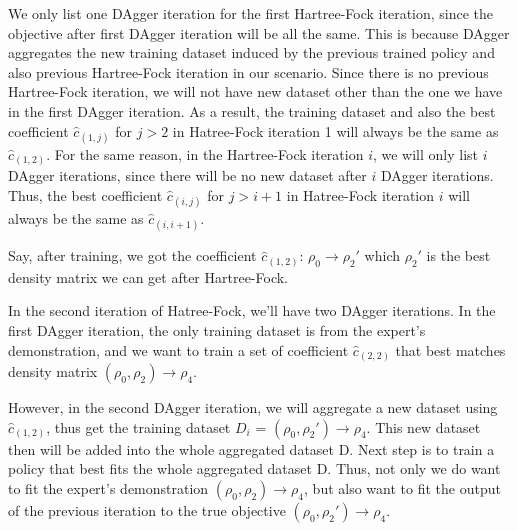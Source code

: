 \documentclass[twoside,11pt]{article}
\begin{document}
We only list one DAgger iteration for the first Hartree-Fock iteration, since the objective after first DAgger iteration will be all the same. This is because DAgger aggregates the new training dataset induced by the previous trained policy and also previous Hartree-Fock iteration in our scenario. Since there is no previous Hartree-Fock iteration, we will not have new dataset other than the one we have in the first DAgger iteration. As a result, the training dataset and also the best coefficient $\hat{c}_{(1,j)}$ for $j>2$ in Hatree-Fock iteration 1 will always be the same as $\hat{c}_{(1,2)}$. For the same reason, in the Hartree-Fock iteration $i$, we will only list $i$ DAgger iterations, since there will be no new dataset after $i$ DAgger iterations. Thus, the best coefficient $\hat{c}_{(i,j)}$ for $j>i+1$ in Hatree-Fock iteration $i$ will always be the same as $\hat{c}_{(i,i+1)}$.

Say, after training, we got the coefficient $\hat{c}_{(1,2)}$: $\rho_0 \rightarrow \rho_{2}'$ which $\rho_2'$ is the best density matrix we can get after Hartree-Fock.


In the second iteration of Hatree-Fock, we'll have two DAgger iterations. In the first DAgger iteration, the only training dataset is from the expert's demonstration, and we want to train a set of coefficient  $\hat{c}_{(2,2)}$ that best matches density matrix $(\rho_0,\rho_2) \rightarrow \rho_4$.

However, in the second DAgger iteration, we will aggregate a new dataset using $\hat{c}_{(1,2)}$, thus get the training dataset $D_i$ = $(\rho_0, \rho_2') \rightarrow \rho_4$. This new dataset then will be added into the whole aggregated dataset D.
Next step is to train a policy that best fits the whole aggregated dataset D. Thus, not only we do want to fit the expert's demonstration $(\rho_0, \rho_2) \rightarrow \rho_4$, but also want to fit the output of the previous iteration to the true objective $ (\rho_0,\rho_{2}') \rightarrow \rho_4$. 
\end{document}
